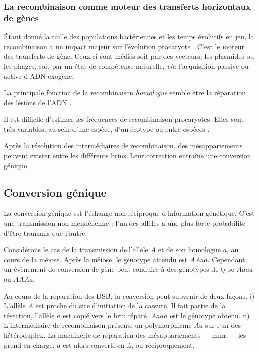 \documentclass[11pt, oneside]{scrartcl}
\begin{document}
\subsubsection{La recombinaison comme moteur des transferts horizontaux de gènes}
\label{sec:orgheadline5}

Étant donné la taille des populations bactériennes et les temps évolutifs en
jeu, la recombinaison a un impact majeur sur l'évolution procaryote
\cite{didelot_impact_2010}. C'est le moteur des transferts de gène. Ceux-ci sont
médiés soit par des vecteurs, les plasmides ou les phages, soit par un état de
compétence naturelle, \emph{via} l'acquisition passive ou active d'ADN exogène. 

La principale fonction de la recombinaison \emph{homologue} semble être la réparation
des lésions de l'ADN \cite{fall_horizontal_2007, michod_adaptive_2008}. 

Il est difficile d'estimer les fréquences de recombinaison procaryotes. Elles
sont très variables, au sein d'une espèce, d'un écotype ou entre espèces
\cite{didelot_impact_2010}.


\begin{transition}
Après la résolution des intermédiaires de recombinaison, des mésappariements
peuvent exister entre les différents brins. Leur correction entraîne une
conversion génique.
\end{transition}


\subsection{Conversion génique}
\label{sec:orgheadline2}
La conversion génique est l'échange non réciproque d'information génétique.
C'est une transmission non-mendélienne : l'un des allèles a une plus forte
probabilité d'être transmis que l'autre\cite{chen_gene_2007}. 

Considérons le cas de la transmission de l'allèle \(A\) et de son homologue \(a\),
au cours de la méiose. Après la méiose, le génotype attendu est \(AAaa\).
Cependant, un évènement de conversion de gène peut conduire à des génotypes de
type \(Aaaa\) ou \(AAAa\). 

Au cours de la réparation des DSB, la conversion peut subvenir de deux façons.
i) L'allèle \(A\) est proche du site d'initiation de la cassure. Il fait partie de
la résection, l'allèle \(a\) est copié vers le brin réparé. \(Aaaa\) est le génotype
obtenu. ii) L'intermédiaire de recombinaison présente un polymorphisme \(Aa\) sur
l'un des hétéroduplex. La machinerie de réparation des mésappariements ---
\ac{mmr} --- les prend en charge. \(a\) est alors converti en \(A\), ou
réciproquement.
\end{document}
